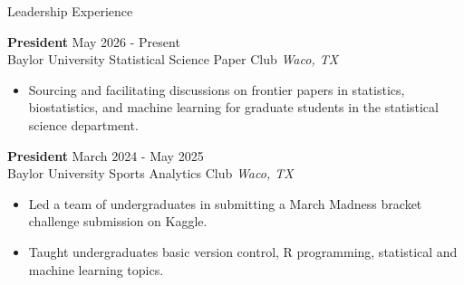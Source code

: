 \documentclass{resume} %
\begin{document}
\begin{rSection}{Leadership Experience}


 \textbf{President} \hfill May 2026 - Present\\
Baylor University Statistical Science Paper Club \hfill \textit{Waco, TX}
 \begin{itemize}
    \itemsep -3pt {}
     \item Sourcing and facilitating discussions on frontier papers in statistics, biostatistics, and machine learning for graduate students in the statistical science department.
 \end{itemize}

\textbf{President} \hfill March 2024 - May 2025\\
Baylor University Sports Analytics Club \hfill \textit{Waco, TX}
 \begin{itemize}
    \itemsep -3pt {}
     \item Led a team of undergraduates in submitting a March Madness bracket challenge submission on Kaggle.
     \item Taught undergraduates basic version control, R programming, statistical and machine learning topics.
 \end{itemize}


\end{rSection}


\end{document}
